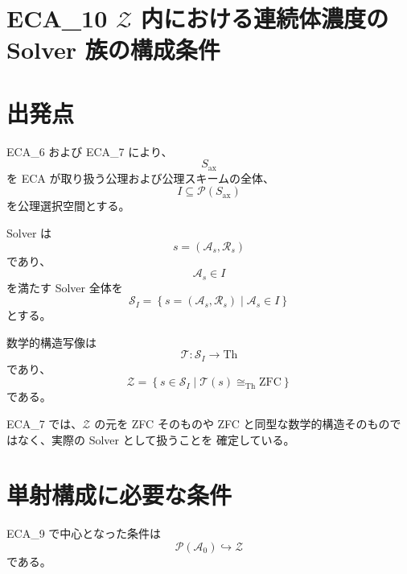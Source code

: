 \documentclass[a4paper,11pt]{article}
\newcommand{\Solver}{\mathcal{S}}
\newcommand{\Ax}{S_{\mathrm{ax}}}
\newcommand{\Th}{\mathrm{Th}}
\begin{document}


\section{ECA_10 $\mathcal{Z}$ 内における連続体濃度の Solver 族の構成条件}

\begin{abstract}
ECA_9 では、可算無限な公理候補集合 $\mathcal{A}_0$ に対して
\[
\mathcal{P}(\mathcal{A}_0)\hookrightarrow\mathcal{Z}
\]
を構成できれば
\[
|\mathcal{Z}|\geq2^{\aleph_0}
\]
が得られることを示した。

本稿では、その単射を実際に構成するために必要となる条件を、
ECA_6 および ECA_7 の Solver 構造に沿って具体化する。
特に、公理選択を変化させながらも表現される数学的構造を ZFC と
数学的構造同型に保つためには、単に公理候補を増やすだけでは不十分で
あることを確認する。その上で、ZFC と両立する可算無限の冗長な
公理候補族を仮定した条件付き構成を与える。

本稿の構成は現行 ECA の定義だけから自動的に得られる定理ではない。
「既存 ECA から確定する結果」と「追加条件の下で成立する構成」を
明確に分離する。
\end{abstract}

\section{出発点}

ECA_6 および ECA_7 により、
\[
\Ax
\]
を ECA が取り扱う公理および公理スキームの全体、
\[
I\subseteq\mathcal{P}(\Ax)
\]
を公理選択空間とする。

Solver は
\[
s=(\mathcal{A}_s,\mathcal{R}_s)
\]
であり、
\[
\mathcal{A}_s\in I
\]
を満たす Solver 全体を
\[
\Solver_I=
\left\{
s=(\mathcal{A}_s,\mathcal{R}_s)\mid
\mathcal{A}_s\in I
\right\}
\]
とする。

数学的構造写像は
\[
\mathcal{T}:\Solver_I\to\Th
\]
であり、
\[
\mathcal{Z}=
\left\{
s\in\Solver_I\mid
\mathcal{T}(s)\cong_{\mathrm{Th}}\mathrm{ZFC}
\right\}
\]
である。

ECA_7 では、$\mathcal{Z}$ の元を ZFC そのものや
ZFC と同型な数学的構造そのものではなく、実際の Solver として扱うことを
確定している。

\section{単射構成に必要な条件}

ECA_9 で中心となった条件は
\[
\mathcal{P}(\mathcal{A}_0)\hookrightarrow\mathcal{Z}
\]
である。
\end{document}
